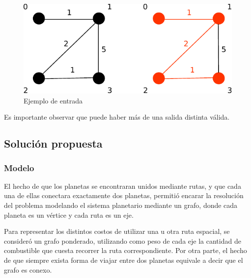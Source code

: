    \begin{figure}[H]
        \centering
        \includegraphics{imagenes/ej2_modelo_1.pdf}
        \caption*{Ejemplo de entrada}
        \label{ej2:ejemplo}
    \end{figure}

    Es importante observar que puede haber más de una salida distinta válida.

    \subsection{Solución propuesta}

    \subsubsection{Modelo}

    El hecho de que los planetas se encontraran unidos mediante rutas, y que
    cada una de ellas conectara exactamente dos planetas, permitió encarar la
    resolución del problema modelando el sistema planetario mediante un
    grafo, donde cada planeta es un vértice y cada ruta es un eje.

    Para representar los distintos costos de utilizar una u otra ruta
    espacial, se consideró un grafo ponderado, utilizando como peso de cada
    eje la cantidad de combustible que cuesta recorrer la ruta
    correspondiente. Por otra parte, el hecho de que siempre exista forma de
    viajar entre dos planetas equivale a decir que el grafo es conexo.


